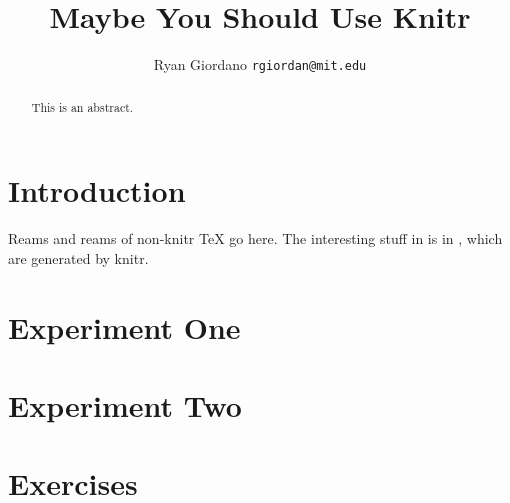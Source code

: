 \documentclass[11pt]{article}
\begin{document}
\title{Maybe You Should Use Knitr}

\author{Ryan Giordano \texttt{rgiordan@mit.edu}}

\maketitle

\begin{abstract}
This is an abstract.
\end{abstract}

\section{Introduction}

Reams and reams of non-knitr TeX go here. The interesting stuff in is in
, which are generated by knitr.

\section{Experiment One}


\section{Experiment Two}


\section{Exercises}



\end{document}
